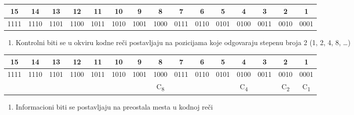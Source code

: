 \documentclass[a4paper,11pt]{article}
\numberwithin{equation}{section}
\newcommand{\redlinija}{\arrayrulecolor{black!28}\specialrule{0.3pt}{2pt}{2pt}\arrayrulecolor{black}}
\begin{document}
\begin{center}\begin{minipage}{\linewidth}\centering\captionsetup{hypcap=false}
\label{tab:pozicije}
\begin{adjustbox}{max width=\linewidth}
\begin{tabular}{ccccccccccccccc}\toprule
15 & 14 & 13 & 12 & 11 & 10 & 9 & 8 & 7 & 6 & 5 & 4 & 3 & 2 & 1 \\
\midrule
1111 & 1110 & 1101 & 1100 & 1011 & 1010 & 1001 & 1000 & 0111 & 0110 & 0101 & 0100 & 0011 & 0010 & 0001 \\
\bottomrule\end{tabular}\end{adjustbox}\end{minipage}\end{center}


\begin{enumerate}[label=\arabic*.,start=2,leftmargin=*]
\item Kontrolni biti se u okviru kodne reči postavljaju na pozicijama koje odgovaraju stepenu broja 2 (1, 2, 4, 8, \ldots{})

\end{enumerate}


\begin{center}\begin{minipage}{\linewidth}\centering\captionsetup{hypcap=false}
\label{tab:kontrolni}
\begin{adjustbox}{max width=\linewidth}
\begin{tabular}{ccccccccccccccc}\toprule
15 & 14 & 13 & 12 & 11 & 10 & 9 & 8 & 7 & 6 & 5 & 4 & 3 & 2 & 1 \\
\midrule
1111 & 1110 & 1101 & 1100 & 1011 & 1010 & 1001 & 1000 & 0111 & 0110 & 0101 & 0100 & 0011 & 0010 & 0001 \\
\redlinija
 &  &  &  &  &  &  & C\textsubscript{8} &  &  &  & C\textsubscript{4} &  & C\textsubscript{2} & C\textsubscript{1} \\
\bottomrule\end{tabular}\end{adjustbox}\end{minipage}\end{center}


\begin{enumerate}[label=\arabic*.,start=3,leftmargin=*]
\item Informacioni biti se postavljaju na preostala mesta u kodnoj reči

\end{enumerate}
\end{document}
